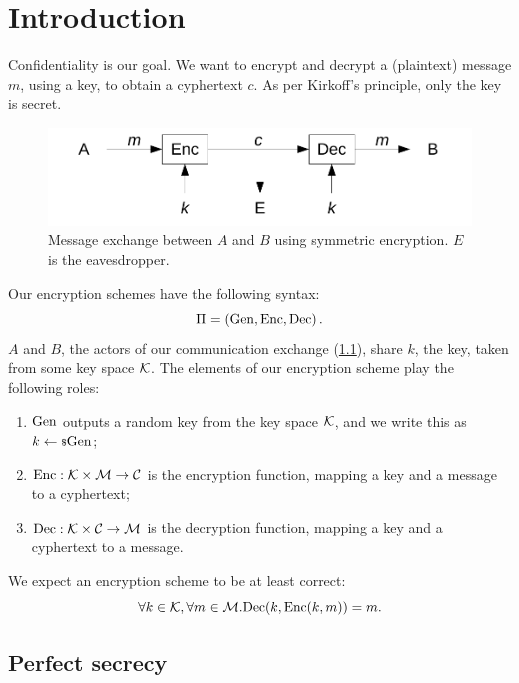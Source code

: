 
\chapter{Introduction}


Confidentiality is our goal.
We want to encrypt and decrypt a (plaintext) message $m$, using a key, to obtain a cyphertext $c$.
As per Kirkoff's principle, only the key is secret.

\begin{figure}
	\centering
	\includegraphics[width=0.8\linewidth]{drawings/symmetric-encryption.pdf}
	\caption{Message exchange between $A$ and $B$ using symmetric encryption. $E$ is the eavesdropper. \label{fig:symmetric-encryption}}
\end{figure}

Our encryption schemes have the following syntax:
\begin{equation*}
	\Pi = \left( \mathrm{Gen}, \allowbreak \mathrm{Enc}, \allowbreak \mathrm{Dec} \right).
\end{equation*}
$A$ and $B$, the actors of our communication exchange (\cref{fig:symmetric-encryption}), share $k$, the key, taken from some key space $\mathcal{K}$.
The elements of our encryption scheme play the following roles:
\begin{enumerate}
	\item $\mathrm{Gen}$ outputs a random key from the key space $\mathcal{K}$, and we write this as $k \leftarrow {\scriptstyle \$} {\mathrm{Gen}}$;
	\item $\mathrm{Enc} : \mathcal{K} \times \mathcal{M} \to \mathcal{C}$ is the encryption function, mapping a key and a message to a cyphertext;
	\item $\mathrm{Dec} : \mathcal{K} \times \mathcal{C} \to \mathcal{M}$ is the decryption function, mapping a key and a cyphertext to a message.
\end{enumerate}
We expect an encryption scheme to be at least correct:
\begin{equation*}
	\forall k \in \mathcal{K}, \forall m \in \mathcal{M} . \mathrm{Dec}(k, \mathrm{Enc}(k, m)) = m.
\end{equation*}

\section{Perfect secrecy}

